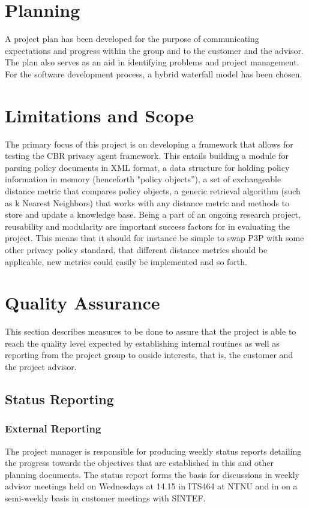 \section{Planning}
A project plan has been developed for the purpose of communicating expectations and progress within the group and to the customer and the advisor. The plan also serves as an aid in identifying problems and project management. For the software development process, a hybrid waterfall model has been chosen.


\section{Limitations and Scope}
The primary focus of this project is on developing a framework that allows for testing the CBR privacy agent framework. This entails building a module for parsing policy documents in XML format, a data structure for holding policy information in memory (henceforth "policy objects''), a set of exchangeable distance metric that compares policy objects, a generic retrieval algorithm (such as k Nearest Neighbors) that works with any distance metric and methods to store and update a knowledge base. Being a part of an ongoing research project, reusability and modularity are important success factors for in evaluating the project. This means that it should for instance be simple to swap P3P with some other privacy policy standard, that different distance metrics should be applicable, new metrics could easily be implemented and so forth.


\section{Quality Assurance}

This section describes measures to be done to assure that the project is able to reach the quality level expected by establishing internal routines as well as reporting from the project group to ouside interests, that is, the customer and the project advisor.

\subsection{Status Reporting}

\subsubsection{External Reporting}
The project manager is responsible for producing weekly status reports detailing the progress towards the objectives that are established in this and other planning documents. The status report forms the basis for discussions in weekly advisor meetings held on Wednesdays at 14.15 in ITS464 at NTNU and in on a semi-weekly basis in customer meetings with SINTEF.

